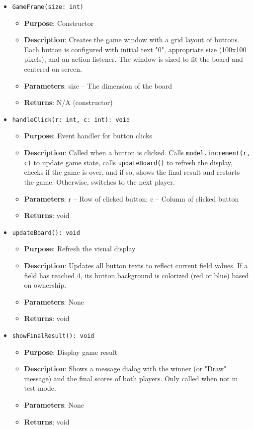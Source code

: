 \documentclass[12pt,a4paper]{article}
\begin{document}
\begin{itemize}
    \item \texttt{GameFrame(size: int)}
    \begin{itemize}
        \item \textbf{Purpose}: Constructor
        \item \textbf{Description}: Creates the game window with a grid layout of buttons. Each button is configured with initial text "0", appropriate size (100x100 pixels), and an action listener. The window is sized to fit the board and centered on screen.
        \item \textbf{Parameters}: size -- The dimension of the board
        \item \textbf{Returns}: N/A (constructor)
    \end{itemize}
    
    \item \texttt{handleClick(r: int, c: int): void}
    \begin{itemize}
        \item \textbf{Purpose}: Event handler for button clicks
        \item \textbf{Description}: Called when a button is clicked. Calls \texttt{model.increment(r, c)} to update game state, calls \texttt{updateBoard()} to refresh the display, checks if the game is over, and if so, shows the final result and restarts the game. Otherwise, switches to the next player.
        \item \textbf{Parameters}: r -- Row of clicked button; c -- Column of clicked button
        \item \textbf{Returns}: void
    \end{itemize}
    
    \item \texttt{updateBoard(): void}
    \begin{itemize}
        \item \textbf{Purpose}: Refresh the visual display
        \item \textbf{Description}: Updates all button texts to reflect current field values. If a field has reached 4, its button background is colorized (red or blue) based on ownership.
        \item \textbf{Parameters}: None
        \item \textbf{Returns}: void
    \end{itemize}
    
    \item \texttt{showFinalResult(): void}
    \begin{itemize}
        \item \textbf{Purpose}: Display game result
        \item \textbf{Description}: Shows a message dialog with the winner (or "Draw" message) and the final scores of both players. Only called when not in test mode.
        \item \textbf{Parameters}: None
        \item \textbf{Returns}: void
    \end{itemize}
    

\end{itemize}
\end{document}
